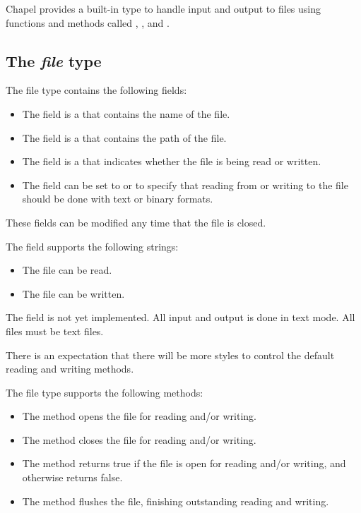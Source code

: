 \label{Input_and_Output}

Chapel provides a built-in  type to handle input and output
to files using functions and methods called , ,
and .

\subsection{The {\em file} type}

The file type contains the following fields:
\begin{itemize}
\item
The  field is a  that contains the name of
the file.
\item
The  field is a  that contains the path of the
file.
\item
The  field is a  that indicates whether the
file is being read or written.
\item
The  field can be set to  or  to
specify that reading from or writing to the file should be done with
text or binary formats.
\end{itemize}
These fields can be modified any time that the file is closed.

The  field supports the following strings:
\begin{itemize}
\item
{} The file can be read.
\item
{} The file can be written.
\end{itemize}

\begin{status}
The  field is not yet implemented.  All input and output
is done in text mode.  All files must be text files.

There is an expectation that there will be more styles to control the
default reading and writing methods.
\end{status}

The file type supports the following methods:
\begin{itemize}
\item
The  method opens the file for reading and/or writing.
\item
The  method closes the file for reading and/or writing.
\item
The  method returns true if the file is open for reading
and/or writing, and otherwise returns false.
\item
The  method flushes the file, finishing outstanding
reading and writing.
\end{itemize}

